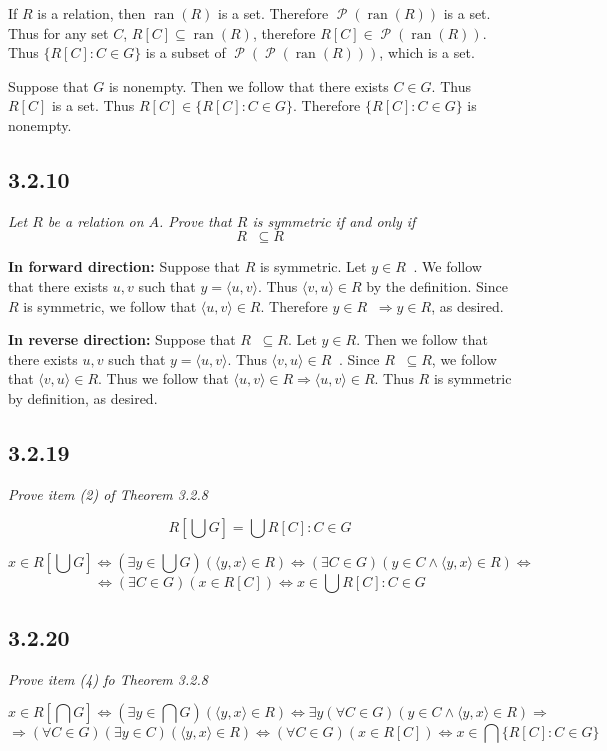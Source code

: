 \documentclass[11pt,oneside,titlepage]{book}
\DeclareMathOperator \pow {\mathcal {P}}
\DeclareMathOperator \inv {^{-1}}
\DeclareMathOperator \lra {\Leftrightarrow}
\DeclareMathOperator \ra {\Rightarrow}
\DeclareMathOperator \ran {ran}
\newcommand{\eangle}[1]{\langle #1 \rangle}
\begin{document}
If $R$ is a relation, then $\ran(R)$ is a set. Therefore $\pow(\ran(R))$ is a set. Thus
for any set $C$, $R[C] \subseteq \ran(R)$, therefore $R[C] \in \pow(\ran(R))$. Thus
$\{R[C]: C \in G\}$ is a subset of $\pow(\pow(\ran(R)))$, which is a set.

Suppose that $G$ is nonempty. Then we follow that there exists $C \in G$. Thus
$R[C]$ is a set. Thus $R[C] \in \{R[C]: C \in G\}$. Therefore $\{R[C]: C \in G\}$ is
nonempty.

\subsection*{3.2.10}

\textit{Let $R$ be a relation on $A$. Prove that $R$ is symmetric if and only if
  $$R\inv \subseteq R$$}

\textbf{In forward direction: }
Suppose that $R$ is symmetric. 
Let $y \in R \inv$. We follow that there exists $u, v$ such that $y = \eangle{u, v}$.
Thus $\eangle{v, u} \in R$ by the definition. Since $R$ is symmetric, we follow that
$\eangle{u, v} \in R$. Therefore $y \in R\inv \ra y \in R$, as desired.

\textbf{In reverse direction: }
Suppose that $R\inv \subseteq R$. Let $y \in R$. Then we follow that there exists
$u, v$ such that $y = \eangle{u, v}$. Thus $\eangle{v, u} \in R\inv$. Since $R\inv \subseteq R$,
we follow that $\eangle{v, u} \in R$. Thus we follow that $\eangle{u, v} \in R \ra
\eangle{u, v} \in R$. Thus $R$ is symmetric by definition, as desired.

\subsection*{3.2.19}

\textit{Prove item (2) of Theorem 3.2.8}

$$R[\bigcup G] = \bigcup{R[C]: C \in G}$$

$$x \in R[\bigcup G] \lra (\exists y \in \bigcup G)(\eangle{y, x} \in R) \lra
(\exists C \in G)(y \in C \land \eangle{y, x} \in R) \lra$$
$$\lra (\exists C \in G)(x \in R[C]) \lra x \in \bigcup{R[C]: C \in G}$$

\subsection*{3.2.20}

\textit{Prove item (4) fo Theorem 3.2.8}

$$x \in R[\bigcap G] \lra (\exists y \in \bigcap G)(\eangle{y, x} \in R) \lra
\exists y (\forall C \in  G)( y \in C \land \eangle{y, x} \in R) \ra$$
$$ \ra
(\forall C \in G) (\exists y \in C) ( \eangle{y, x} \in R) \lra
(\forall C \in G) (x \in R[C]) \lra x \in \bigcap{\{R[C]: C \in G\}}$$
\end{document}
